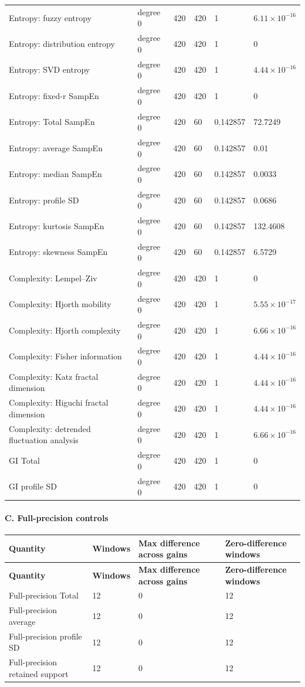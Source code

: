 \documentclass[10pt]{article}
\begin{document}
\begin{landscape}
\begin{longtable}{p{3.6cm}p{2.0cm}p{2.4cm}p{1.2cm}p{2.1cm}p{2.4cm}}
Entropy: fuzzy entropy & degree 0 & 420 & 420 & 1 & $6.11\times10^{-16}$ \\
Entropy: distribution entropy & degree 0 & 420 & 420 & 1 & 0 \\
Entropy: SVD entropy & degree 0 & 420 & 420 & 1 & $4.44\times10^{-16}$ \\
Entropy: fixed-r SampEn & degree 0 & 420 & 420 & 1 & 0 \\
Entropy: Total SampEn & degree 0 & 420 & 60 & 0.142857 & 72.7249 \\
Entropy: average SampEn & degree 0 & 420 & 60 & 0.142857 & 0.01 \\
Entropy: median SampEn & degree 0 & 420 & 60 & 0.142857 & 0.0033 \\
Entropy: profile SD & degree 0 & 420 & 60 & 0.142857 & 0.0686 \\
Entropy: kurtosis SampEn & degree 0 & 420 & 60 & 0.142857 & 132.4608 \\
Entropy: skewness SampEn & degree 0 & 420 & 60 & 0.142857 & 6.5729 \\
Complexity: Lempel--Ziv & degree 0 & 420 & 420 & 1 & 0 \\
Complexity: Hjorth mobility & degree 0 & 420 & 420 & 1 & $5.55\times10^{-17}$ \\
Complexity: Hjorth complexity & degree 0 & 420 & 420 & 1 & $6.66\times10^{-16}$ \\
Complexity: Fisher information & degree 0 & 420 & 420 & 1 & $4.44\times10^{-16}$ \\
Complexity: Katz fractal dimension & degree 0 & 420 & 420 & 1 & $4.44\times10^{-16}$ \\
Complexity: Higuchi fractal dimension & degree 0 & 420 & 420 & 1 & $4.44\times10^{-16}$ \\
Complexity: detrended fluctuation analysis & degree 0 & 420 & 420 & 1 & $6.66\times10^{-16}$ \\
GI Total & degree 0 & 420 & 420 & 1 & 0 \\
GI profile SD & degree 0 & 420 & 420 & 1 & 0 \\
\bottomrule
\end{longtable}
\paragraph{C. Full-precision controls}\begin{longtable}{p{3cm}p{1.5cm}p{4cm}p{3cm}}
\toprule
\textbf{Quantity} & \textbf{Windows} & \textbf{Max difference across gains} & \textbf{Zero-difference windows} \\
\midrule
\endfirsthead
\toprule
\textbf{Quantity} & \textbf{Windows} & \textbf{Max difference across gains} & \textbf{Zero-difference windows} \\
\midrule
\endhead
Full-precision Total & 12 & 0 & 12 \\
Full-precision average & 12 & 0 & 12 \\
Full-precision profile SD & 12 & 0 & 12 \\
Full-precision retained support & 12 & 0 & 12 \\
\bottomrule
\end{longtable}

\end{landscape}
\end{document}
